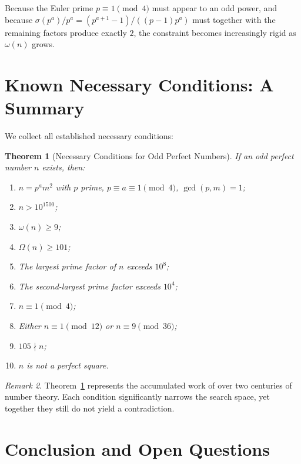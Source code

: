 \documentclass[12pt,a4paper]{amsart}
\newtheorem{theorem}{Theorem}[section]
\theoremstyle{definition}
\theoremstyle{remark}
\newtheorem{remark}[theorem]{Remark}
\begin{document}
Because the Euler prime $p \equiv 1 \pmod{4}$ must appear to an odd power,
and because $\sigma(p^a)/p^a = (p^{a+1}-1)/((p-1)p^a)$ must together
with the remaining factors produce exactly $2$, the constraint becomes
increasingly rigid as $\omega(n)$ grows.

\section{Known Necessary Conditions: A Summary}

We collect all established necessary conditions:

\begin{theorem}[Necessary Conditions for Odd Perfect Numbers]
\label{thm:necessary}
If an odd perfect number $n$ exists, then:
\begin{enumerate}[label=(\roman*)]
  \item $n = p^a m^2$ with $p$ prime, $p \equiv a \equiv 1 \pmod{4}$, $\gcd(p,m)=1$;
  \item $n > 10^{1500}$;
  \item $\omega(n) \geq 9$;
  \item $\Omega(n) \geq 101$;
  \item The largest prime factor of $n$ exceeds $10^8$;
  \item The second-largest prime factor exceeds $10^4$;
  \item $n \equiv 1 \pmod{4}$;
  \item Either $n \equiv 1 \pmod{12}$ or $n \equiv 9 \pmod{36}$;
  \item $105 \nmid n$;
  \item $n$ is not a perfect square.
\end{enumerate}
\end{theorem}

\begin{remark}
Theorem~\ref{thm:necessary} represents the accumulated work of over two
centuries of number theory.
Each condition significantly narrows the search space, yet together they
still do not yield a contradiction.
\end{remark}

\section{Conclusion and Open Questions}
\end{document}
